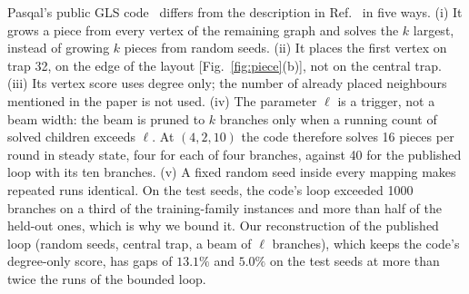 \documentclass[10pt,pra,aps,twocolumn,superscriptaddress,floatfix,nofootinbib]{revtex4-2}
\newcommand{\GLS}{GLS}
\begin{document}
Pasqal's public \GLS{} code~\cite{garrigues2025docking} differs from the description in Ref.~\cite{cazals2025gadgets} in five ways. (i) It grows a piece from every vertex of the remaining graph and solves the $k$ largest, instead of growing $k$ pieces from random seeds. (ii) It places the first vertex on trap 32, on the edge of the layout [Fig.~\ref{fig:piece}(b)], not on the central trap. (iii) Its vertex score uses degree only; the number of already placed neighbours mentioned in the paper is not used. (iv) The parameter $\ell$ is a trigger, not a beam width: the beam is pruned to $k$ branches only when a running count of solved children exceeds $\ell$. At $(4,2,10)$ the code therefore solves 16 pieces per round in steady state, four for each of four branches, against 40 for the published loop with its ten branches. (v) A fixed random seed inside every mapping makes repeated runs identical. On the test seeds, the code's loop exceeded 1000 branches on a third of the training-family instances and more than half of the held-out ones, which is why we bound it. Our reconstruction of the published loop (random seeds, central trap, a beam of $\ell$ branches), which keeps the code's degree-only score, has gaps of $13.1\%$ and $5.0\%$ on the test seeds at more than twice the runs of the bounded loop.


\end{document}
